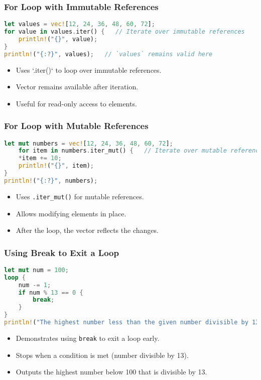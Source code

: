 \documentclass[aspectratio=169, table]{beamer}
\begin{document}
\begin{frame}[fragile]
\frametitle{For Loop with Immutable References}
\begin{lstlisting}[language=Rust]
let values = vec![12, 24, 36, 48, 60, 72];
for value in values.iter() {   // Iterate over immutable references
	println!("{}", value);
}
println!("{:?}", values);   // `values` remains valid here
\end{lstlisting}
\begin{itemize}
\item Uses `.iter()` to loop over immutable references.
\item Vector remains available after iteration.
\item Useful for read-only access to elements.
\end{itemize}
\end{frame}

\begin{frame}[fragile]
\frametitle{For Loop with Mutable References}
\begin{lstlisting}[language=Rust]
let mut numbers = vec![12, 24, 36, 48, 60, 72];
	for item in numbers.iter_mut() {   // Iterate over mutable references
	*item += 10;
	println!("{}", item);
}
println!("{:?}", numbers);
\end{lstlisting}
\begin{itemize}
\item Uses \texttt{.iter\_mut()} for mutable references.
\item Allows modifying elements in place.
\item After the loop, the vector reflects the changes.
\end{itemize}
\end{frame}

\begin{frame}[fragile]
\frametitle{Using Break to Exit a Loop}
\begin{lstlisting}[language=Rust]
let mut num = 100;
loop {
	num -= 1;
	if num % 13 == 0 {
		break;
	}
}
println!("The highest number less than the given number divisible by 13 is {}", num);
\end{lstlisting}
\begin{itemize}
\item Demonstrates using \texttt{break} to exit a loop early.
\item Stops when a condition is met (number divisible by 13).
\item Outputs the highest number below 100 that is divisible by 13.
\end{itemize}
\end{frame}
\end{document}
